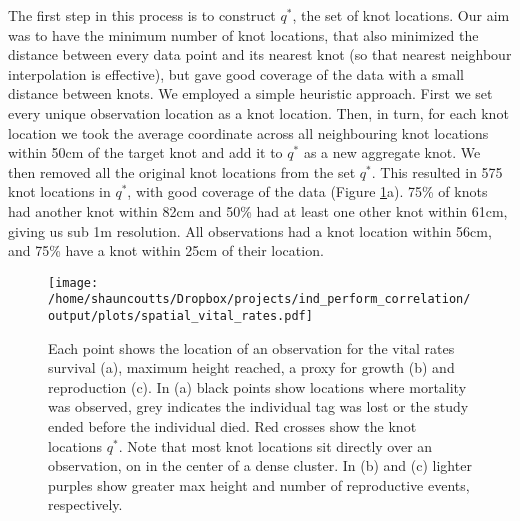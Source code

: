 \documentclass[12pt,a4paper]{article}
\begin{document}
The first step in this process is to construct $q^*$, the set of knot locations. Our aim was to have the minimum number of knot locations, that also minimized the distance between every data point and its nearest knot (so that nearest neighbour interpolation is effective), but gave good coverage of the data with a small distance between knots. We employed a simple heuristic approach. First we set every unique observation location as a knot location. Then, in turn, for each knot location we took the average coordinate across all neighbouring knot locations within 50cm of the target knot and add it to $q^*$ as a new aggregate knot. We then removed all the original knot locations from the set $q^*$. This resulted in 575 knot locations in $q^*$, with good coverage of the data (Figure \ref{fig:loc_map}a). 75\% of knots had another knot within 82cm and 50\% had at least one other knot within 61cm, giving us sub 1m resolution. All observations had a knot location within 56cm, and 75\% have a knot within 25cm of their location. 

\begin{figure}[!h] 
	\texttt{[image: /home/shauncoutts/Dropbox/projects/ind\_perform\_correlation/output/plots/spatial\_vital\_rates.pdf]}
\caption{Each point shows the location of an observation for the vital rates survival (a), maximum height reached, a proxy for growth (b) and reproduction (c). In (a) black points show locations where mortality was observed, grey indicates the individual tag was lost or the study ended before the individual died. Red crosses show the knot locations $q^*$. Note that most knot locations sit directly over an observation, on in the center of a dense cluster. In (b) and (c) lighter purples show greater max height and number of reproductive events, respectively.} 
\label{fig:loc_map}
\end{figure}
\end{document}
